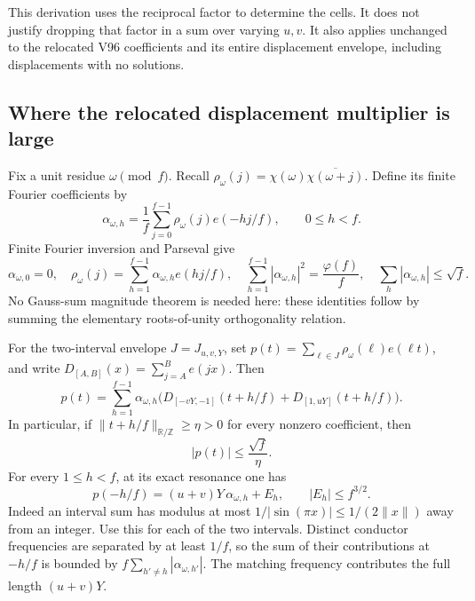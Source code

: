 \documentclass[11pt]{article}
\theoremstyle{definition}
\theoremstyle{remark}
\begin{document}
This derivation uses the reciprocal factor to determine the cells.
It does not justify dropping that factor in a sum over varying \(u,v\).
It also applies unchanged to the relocated V96 coefficients and its
entire displacement envelope, including displacements with no solutions.

\subsection{Where the relocated displacement multiplier is large}

Fix a unit residue \(\omega\pmod f\).  Recall
\(\rho_\omega(j)=\chi(\omega)\overline{\chi(\omega+j)}\).
Define its finite Fourier coefficients by
\begin{equation}
 \alpha_{\omega,h}=\frac1f\sum_{j=0}^{f-1}
           \rho_\omega(j)e(-hj/f),\qquad 0\le h<f.
 \label{eq:f2v97-alpha}
\end{equation}
Finite Fourier inversion and Parseval give
\begin{equation}
 \alpha_{\omega,0}=0,\quad
 \rho_\omega(j)=\sum_{h=1}^{f-1}\alpha_{\omega,h}e(hj/f),\quad
 \sum_{h=1}^{f-1}|\alpha_{\omega,h}|^2=\frac{\varphi(f)}f,
 \quad \sum_h|\alpha_{\omega,h}|\le\sqrt f.
 \label{eq:f2v97-dft}
\end{equation}
No Gauss-sum magnitude theorem is needed here: these identities follow
by summing the elementary roots-of-unity orthogonality relation.

For the two-interval envelope \(J=J_{u,v,Y}\), set
\(p(t)=\sum_{\ell\in J}\rho_\omega(\ell)e(\ell t)\), and write
\(D_{[A,B]}(x)=\sum_{j=A}^B e(jx)\).  Then
\begin{equation}
 p(t)=\sum_{h=1}^{f-1}\alpha_{\omega,h}
       \bigl(D_{[-vY,-1]}(t+h/f)+D_{[1,uY]}(t+h/f)\bigr).
 \label{eq:f2v97-resonance-form}
\end{equation}
In particular, if \(\|t+h/f\|_{\mathbb R/\mathbb Z}\ge\eta>0\)
for every nonzero coefficient, then
\begin{equation}
 |p(t)|\le\frac{\sqrt f}{\eta}.
 \label{eq:f2v97-off-resonance}
\end{equation}
For every \(1\le h<f\), at its exact resonance one has
\begin{equation}
 p(-h/f)=(u+v)Y\,\alpha_{\omega,h}+E_h,
                         \qquad |E_h|\le f^{3/2}.
 \label{eq:f2v97-resonance-value}
\end{equation}
Indeed an interval sum has modulus at most
\(1/|\sin(\pi x)|\le1/(2\|x\|)\) away from an integer.
Use this for each of the two intervals.  Distinct conductor frequencies
are separated by at least \(1/f\), so the sum of their contributions
at \(-h/f\) is bounded by \(f\sum_{h'\ne h}|\alpha_{\omega,h'}|\).
The matching frequency contributes the full length \((u+v)Y\).
\end{document}
